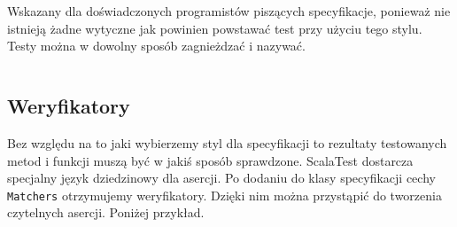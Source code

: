 \documentclass[brudnopis]{xmgr}
\begin{document}
Wskazany dla doświadczonych programistów piszących specyfikacje, ponieważ nie istnieją żadne wytyczne jak powinien powstawać test przy użyciu tego stylu. Testy można w dowolny sposób zagnieżdzać i nazywać.

\inputminted[fontsize=\small]{scala}{code/FreeSpec.scala}


\subsection{Weryfikatory}

\label{weryfikatory}

Bez względu na to jaki wybierzemy styl dla specyfikacji to rezultaty testowanych metod i funkcji muszą być w jakiś sposób sprawdzone. ScalaTest dostarcza specjalny język dziedzinowy dla asercji. Po dodaniu do klasy specyfikacji cechy \texttt{Matchers} otrzymujemy weryfikatory. Dzięki nim można przystąpić do tworzenia czytelnych asercji. Poniżej przykład.
\end{document}
